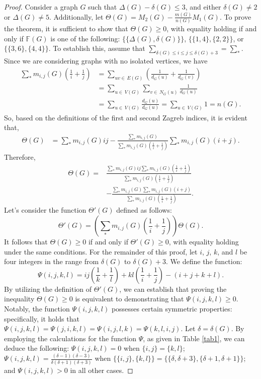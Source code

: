 \documentclass[12pt]{article}
\begin{document}
\begin{proof}
Consider a graph \( G \) such that \( \Delta(G) - \delta(G) \leq 3 \), and either \( \delta(G) \neq 2 \) or \( \Delta(G) \neq 5 \). Additionally, let $ \Theta(G) = M_2(G) - \frac{m(G)}{n(G)} M_1(G) $. To prove the theorem, it is sufficient to show that $ \Theta(G) \geq 0 $, with equality holding if and only if $ \mathbb{F}(G) $ is one of the following: $ \{\{\Delta(G), \delta(G)\}\} $, $ \{\{1, 4\}, \{2, 2\}\} $, or $ \{\{3, 6\}, \{4, 4\}\} $. To establish this, assume that $\sum_{\delta(G) \leq i \leq j \leq \delta(G) + 3} = \sum_{*}$. Since we are considering graphs with no isolated vertices, we have 
\begin{align*}
\sum_{\ast}m_{i,j}(G)(\frac{1}{i}+\frac{1}{j})&=\sum_{uv\in\,E(G)}(\frac{1}{d_G(u)}+\frac{1}{d_G(v)})\\
&=\sum_{u\in\,V(G)}\sum_{v\in\,N_G(u)}\frac{1}{d_G(u)}\\
&=\sum_{u\in\,V(G)}\frac{d_G(u)}{d_G(u)}=\sum_{u\in\,V(G)}1=n(G).
\end{align*}
So, based on the definitions of the first and second Zagreb indices, it is evident that,
\begin{align*}
  \Theta(G) & =\sum_{\ast}m_{i,j}(G)ij-\frac{\sum_{\ast}m_{i,j}(G)}{\sum_{\ast}m_{i,j}(G)(\frac{1}{i}+\frac{1}{j})}\sum_{\ast}m_{i,j}(G)(i+j).
\end{align*} 
Therefore, 
\begin{align*}
  \Theta(G) =&\frac{\sum_{\ast}m_{i,j}(G)ij\sum_{\ast}m_{i,j}(G)(\frac{1}{i}+\frac{1}{j})}{\sum_{\ast}m_{i,j}(G)(\frac{1}{i}+\frac{1}{j})}\\
  &-\frac{\sum_{\ast}m_{i,j}(G)\sum_{\ast}m_{i,j}(G)(i+j)}{\sum_{\ast}m_{i,j}(G)(\frac{1}{i}+\frac{1}{j})}.
\end{align*} 
Let's consider the function $\Theta'(G)$ defined as follows: \[\Theta'(G) = \left(\sum_{\ast} m_{i,j}(G) \left( \frac{1}{i} + \frac{1}{j} \right)\right) \Theta(G).\] It follows that $\Theta(G) \geq 0$ if and only if $\Theta'(G) \geq 0$, with equality holding under the same conditions. For the remainder of this proof, let $i$, $j$, $k$, and $l$ be four integers in the range from $\delta(G)$ to $\delta(G) + 3$. We define the function:
\[
\Psi(i,j,k,l) = ij\left(\frac{1}{k} + \frac{1}{l}\right) + kl\left(\frac{1}{i} + \frac{1}{j}\right) - (i + j + k + l).
\]
By utilizing the definition of $\Theta'(G)$, we can establish that proving the inequality $\Theta(G) \geq 0$ is equivalent to demonstrating that $\Psi(i,j,k,l) \geq 0$. Notably, the function $\Psi(i,j,k,l)$ possesses certain symmetric properties: specifically, it holds that $\Psi(i,j,k,l) = \Psi(j,i,k,l) = \Psi(i,j,l,k) = \Psi(k,l,i,j)$. Let $\delta = \delta(G)$. By employing the calculations for the function $\Psi$, as given in Table \ref{tab1}, we can deduce the following: $\Psi(i,j,k,l) = 0$ when $\{i,j\} = \{k,l\}$; $\Psi(i,j,k,l) = \frac{(\delta-1)(\delta-3)}{\delta(\delta+1)(\delta+3)}$ when $\{\{i,j\},\{k,l\}\} = \{\{\delta,\delta+3\},\{\delta+1,\delta+1\}\}$; and $\Psi(i,j,k,l) > 0$ in all other cases. 

\end{proof}
\end{document}
